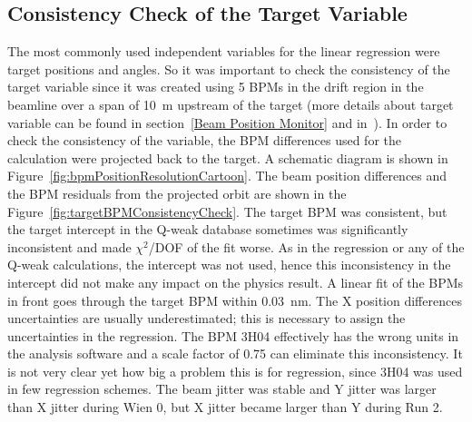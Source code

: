 %
%

\subsection{Consistency Check of the Target Variable}
\label{Consistency Check of the Target Variable }

The most commonly used independent variables for the linear regression were target positions and angles. So it was important to check the consistency of the target variable since it was created using 5 BPMs in the drift region in the beamline over a span of 10~m upstream of the target (more details about target variable can be found in section~\ref{Beam Position Monitor} and in~\cite{nur_linear_reg, buddhini_qweak}). 
In order to check the consistency of the variable, the BPM differences used for the calculation were projected back to the target. A schematic diagram is shown in Figure~\ref{fig:bpmPositionResolutionCartoon}. The beam position differences and the BPM residuals from the projected orbit are shown in the Figure~\ref{fig:targetBPMConsistencyCheck}. The target BPM was consistent, but the target intercept in the Q-weak database sometimes was significantly inconsistent and made $\chi^{2}$/DOF of the fit worse. As in the regression or any of the Q-weak calculations, the intercept was not used, hence this inconsistency in the intercept did not make any impact on the physics result. A linear fit of the BPMs in front goes through the target BPM within 0.03~nm. The X position differences uncertainties are usually underestimated; this is necessary to assign the uncertainties in the regression. The BPM 3H04 effectively has the wrong units in the analysis software and a scale factor of 0.75 can eliminate this inconsistency. It is not very clear yet how big a problem this is for regression, since 3H04 was used in few regression schemes. The beam jitter was stable and Y jitter was larger than X jitter during Wien 0, but X jitter became larger than Y during Run 2. 

